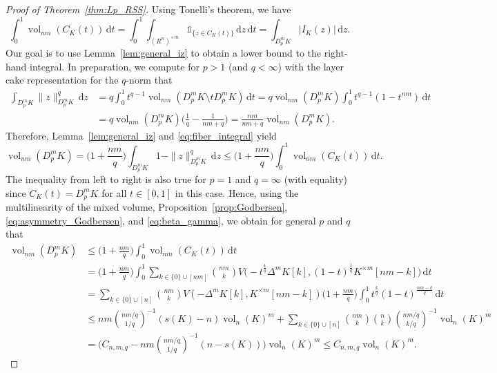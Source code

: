 \documentclass{amsart}
\newcommand\bone{\mathds{1}}
\newcommand{\dd}{\,\mathrm{d}}
\DeclareMathOperator{\vol}{vol}
\newcommand{\diff}[3]{D_{#1}^{#2} #3}
\newcommand{\diag}[2]{\Delta^{#1} #2}
\newcommand{\lyz}[4]{C_{#3} (#4)}
\newcommand{\interval}[4]{I_{#3} (#4)}
\newcommand{\cartesian}[2]{#1^{\times #2}}
\begin{document}
\begin{proof}[Proof of Theorem~\ref{thm:Lp_RSS}]
Using Tonelli's theorem, we have
\begin{equation}\label{eq:fiber_integral}
    \int_0^1 \vol_{nm}(\lyz{p}{m}{K}{t}) \dd t
    = \int_0^1 \int_{\cartesian{(R^n)}{m}} \bone_{\{ z \in \lyz{p}{m}{K}{t} \}} \dd z \dd t
    = \int_{\diff{p}{m}{K}} |\interval{p}{m}{K}{z}| \dd z.
\end{equation}
Our goal is to use Lemma~\ref{lem:general_iz} to obtain a lower bound to the right-hand integral.
In preparation, we compute for $p > 1$ (and $q < \infty$) with the layer cake representation for the $q$-norm that
\begin{align*}
    \int_{\diff{p}{m}{K}} \|z\|_{\diff{p}{m}{K}}^q \dd z
    & = q \int_0^1 t^{q-1} \vol_{nm}(\diff{p}{m}{K} \setminus t \diff{p}{m}{K}) \dd t
    = q \vol_{nm}(\diff{p}{m}{K}) \int_0^1 t^{q-1} (1 - t^{nm}) \dd t
    \\
    & = q \vol_{nm}(\diff{p}{m}{K}) \bigg( \frac{1}{q} - \frac{1}{nm+q} \bigg)
    = \frac{nm}{nm+q} \vol_{nm}(\diff{p}{m}{K}).
\end{align*}
Therefore, Lemma~\ref{lem:general_iz} and \eqref{eq:fiber_integral} yield
\begin{equation}\label{eq:fiber_estimate}
    \vol_{nm}(\diff{p}{m}{K})
    = \bigg( 1 + \frac{nm}{q} \bigg) \int_{\diff{p}{m}{K}} 1 - \|z\|_{\diff{p}{m}{K}}^q \dd z
    \leq \bigg( 1 + \frac{nm}{q} \bigg) \int_0^1 \vol_{nm}(\lyz{p}{m}{K}{t}) \dd t.
\end{equation}
The inequality from left to right is also true for $p = 1$ and $q = \infty$ (with equality) since $\lyz{p}{m}{K}{t} = \diff{p}{m}{K}$ for all $t \in [0,1]$ in this case.
Hence, using the multilinearity of the mixed volume, Proposition~\ref{prop:Godbersen}, \eqref{eq:asymmetry_Godbersen}, and \eqref{eq:beta_gamma},
we obtain for general $p$ and $q$ that
\begin{align*}
    \vol_{nm}(\diff{p}{m}{K})
    & \leq \bigg(1 + \frac{nm}{q} \bigg) \int_0^1 \vol_{nm}(\lyz{p}{m}{K}{t}) \dd t
    \\
    & = \bigg(1 + \frac{nm}{q} \bigg)
    \int_0^1 \sum_{k \in \{0\} \cup [nm]} \binom{nm}{k} V \Big(-t^\frac{1}{q} \diag{m} K[k], (1-t)^\frac{1}{q} \cartesian{K}{m}[nm-k] \Big) \dd t
    \\
    & = \sum_{k \in \{0\} \cup [n]} \binom{nm}{k} V(-\diag{m} K[k], \cartesian{K}{m}[nm-k])
    \bigg(1 + \frac{nm}{q} \bigg) \int_0^1 t^\frac{k}{q} (1-t)^\frac{nm-k}{q} \dd t
    \\
    & \leq nm \binom{nm/q}{1/q}^{-1}  (s(K)-n) \vol_n(K)^m + \sum_{k \in \{0\} \cup [n]} \binom{nm}{k} \binom{n}{k} \binom{nm/q}{k/q}^{-1} \vol_n(K)^m
    \\
    & = \bigg( C_{n,m,q} - nm \binom{nm/q}{1/q}^{-1} (n-s(K)) \bigg) \vol_n(K)^m
    \leq C_{n,m,q} \vol_n(K)^m.
\end{align*}


\end{proof}
\end{document}
